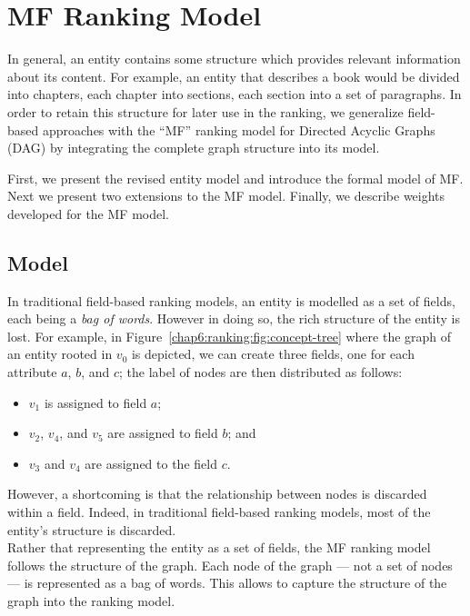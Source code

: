 \section{MF Ranking Model}
\label{chap6:ranking:mf-model}

In general, an entity contains some structure which provides relevant information about its content. For example, an entity that describes a book would be divided into chapters, each chapter into sections, each section into a set of paragraphs. In order to retain this structure for later use in the ranking, we generalize \gls{field}-based approaches with the ``MF'' ranking model for Directed Acyclic Graphs (DAG) by integrating the complete graph structure into its model.

First, we present the revised entity model and introduce the formal model of \gls{MF}. Next we present two extensions to the \gls{MF} model. Finally, we describe weights developed for the \gls{MF} model.

\subsection{Model}

In traditional field-based ranking models, an entity is modelled as a set of fields, each being a \emph{bag of words}. However in doing so, the rich structure of the entity is lost. For example, in Figure~\ref{chap6:ranking:fig:concept-tree} where the graph of an entity rooted in $v_0$ is depicted, we can create three fields, one for each attribute $a$, $b$, and $c$; the label of nodes are then distributed as follows:
\begin{itemize}
	\item $v_1$ is assigned to field $a$;
	\item $v_2$, $v_4$, and $v_5$ are assigned to field $b$; and
	\item $v_3$ and $v_4$ are assigned to the field $c$.
\end{itemize}
However, a shortcoming is that the relationship between nodes is discarded within a field. Indeed, in traditional field-based ranking models, most of the entity's structure is discarded.\\

Rather that representing the entity as a set of fields, the \gls{MF} ranking model follows the structure of the graph. Each node of the graph --- not a set of nodes --- is represented as a bag of words. This allows to capture the structure of the graph into the ranking model.

